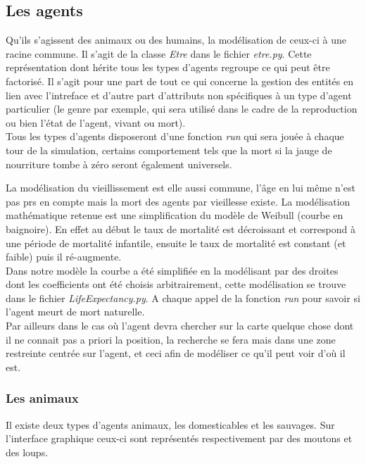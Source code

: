 \documentclass[12pt]{article}
\begin{document}
	\subsection{Les agents}

Qu'ils s'agissent des animaux ou des humains, la modélisation de ceux-ci à 
une racine commune. Il s'agit de la classe \textit{Etre} dans le fichier 
\textit{etre.py}. Cette représentation dont hérite tous les types d'agents 
regroupe ce qui peut être factorisé. Il s'agit pour une part de tout ce qui 
concerne la gestion des entités en lien avec l'intreface et d'autre part 
d'attributs non spécifiques à un type d'agent particulier (le genre par 
exemple, qui sera utilisé dans le cadre de la reproduction ou bien l'état de 
l'agent, vivant ou mort).\\

Tous les types d'agents disposeront d'une fonction \textit{run} qui sera jouée 
à chaque tour de la simulation, certains comportement tels que la mort si la 
jauge de nourriture tombe à zéro seront également universels.

La modélisation du vieillissement est elle aussi commune, l'âge en lui même 
n'est pas prs en compte mais la mort des agents par vieillesse existe. La 
modélisation mathématique retenue est une simplification du modèle de Weibull 
(courbe en baignoire). En effet au début le taux de mortalité est décroissant 
et correspond à une période de mortalité infantile, ensuite le taux de 
mortalité est constant (et faible) puis il ré-augmente.\\

Dans notre modèle la courbe a été simplifiée en la modélisant par des droites 
dont les coefficients ont été choisis arbitrairement, cette modélisation se 
trouve dans le fichier \textit{LifeExpectancy.py}. A chaque appel de la 
fonction \textit{run} pour savoir si l'agent meurt de mort naturelle.\\

Par ailleurs dans le cas où l'agent devra chercher sur la carte quelque chose 
dont il ne connait pas a priori la position, la recherche se fera mais dans 
une zone restreinte centrée sur l'agent, et ceci afin de modéliser ce qu'il 
peut voir d'où il est.

		\subsubsection{Les animaux}

Il existe deux types d'agents animaux, les domesticables et les sauvages. Sur 
l'interface graphique ceux-ci sont représentés respectivement par des moutons 
et des loups.\\
\end{document}
